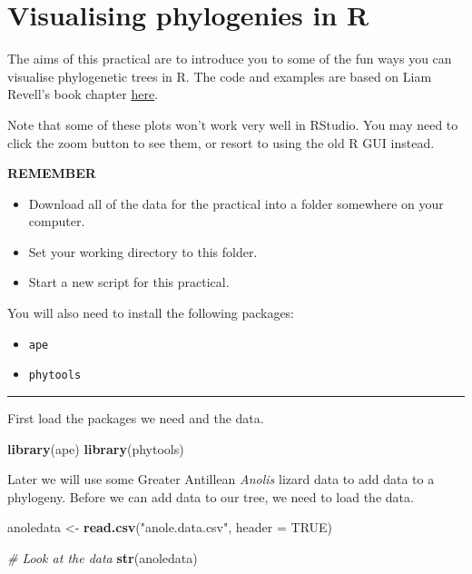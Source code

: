 \documentclass[]{book}
\newenvironment{Shaded}{\begin{snugshade}}{\end{snugshade}}
\newcommand{\KeywordTok}[1]{\textcolor[rgb]{0.13,0.29,0.53}{\textbf{{#1}}}}
\newcommand{\DataTypeTok}[1]{\textcolor[rgb]{0.13,0.29,0.53}{{#1}}}
\newcommand{\StringTok}[1]{\textcolor[rgb]{0.31,0.60,0.02}{{#1}}}
\newcommand{\CommentTok}[1]{\textcolor[rgb]{0.56,0.35,0.01}{\textit{{#1}}}}
\newcommand{\OtherTok}[1]{\textcolor[rgb]{0.56,0.35,0.01}{{#1}}}
\newcommand{\NormalTok}[1]{{#1}}
\providecommand{\tightlist}{%
  \setlength{\itemsep}{0pt}\setlength{\parskip}{0pt}}
\begin{document}
\chapter{Visualising phylogenies in
R}\label{visualising-phylogenies-in-r}

The aims of this practical are to introduce you to some of the fun ways
you can visualise phylogenetic trees in R. The code and examples are
based on Liam Revell's book chapter
\href{http://faculty.umb.edu/liam.revell/pdfs/Revell_2014.MPCM-chapter.pdf}{here}.

Note that some of these plots won't work very well in RStudio. You may
need to click the zoom button to see them, or resort to using the old R
GUI instead.

\textbf{REMEMBER}

\begin{itemize}
\tightlist
\item
  Download all of the data for the practical into a folder somewhere on
  your computer.
\item
  Set your working directory to this folder.
\item
  Start a new script for this practical.
\end{itemize}

You will also need to install the following packages:

\begin{itemize}
\tightlist
\item
  \texttt{ape}
\item
  \texttt{phytools}
\end{itemize}

\begin{center}\rule{0.5\linewidth}{\linethickness}\end{center}

First load the packages we need and the data.

\begin{Shaded}
\begin{Highlighting}[]
\KeywordTok{library}\NormalTok{(ape)}
\KeywordTok{library}\NormalTok{(phytools)}
\end{Highlighting}
\end{Shaded}

Later we will use some Greater Antillean \emph{Anolis} lizard data to
add data to a phylogeny. Before we can add data to our tree, we need to
load the data.

\begin{Shaded}
\begin{Highlighting}[]
\NormalTok{anoledata <-}\StringTok{ }\KeywordTok{read.csv}\NormalTok{(}\StringTok{"anole.data.csv"}\NormalTok{, }\DataTypeTok{header =} \OtherTok{TRUE}\NormalTok{)}

\CommentTok{# Look at the data}
\KeywordTok{str}\NormalTok{(anoledata)}
\end{Highlighting}
\end{Shaded}
\end{document}
